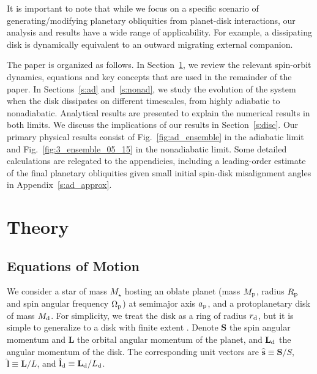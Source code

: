 \documentclass[
        fleqn,
        usenatbib,
    ]{mnras}
\newcommand*{\bm}[1]{\boldsymbol{\mathbf{#1}}}
\newcommand*{\uv}[1]{\hat{\bm{#1}}}
\begin{document}
It is important to note that while we focus on a specific scenario of
generating/modifying planetary obliquities from planet-disk interactions, our
analysis and results have a wide range of applicability. For example, a
dissipating disk is dynamically equivalent to an outward migrating external
companion.

The paper is organized as follows. In Section~\ref{s:eq}, we review the relevant
spin-orbit dynamics, equations and key concepts that are used in the remainder
of the paper. In Sections~\ref{s:ad} and~\ref{s:nonad}, we study the evolution
of the system when the disk dissipates on different timescales, from highly
adiabatic to nonadiabatic. Analytical results are presented to explain the
numerical results in both limits. We discuss the implications of our results in
Section~\ref{s:disc}. Our primary physical results consist of
Fig.~\ref{fig:ad_ensemble} in the adiabatic limit and
Fig.~\ref{fig:3_ensemble_05_15} in the nonadiabatic limit. Some detailed
calculations are relegated to the appendicies, including a leading-order
estimate of the final planetary obliquities given small initial spin-disk
misalignment angles in Appendix~\ref{s:ad_approx}.

\section{Theory}\label{s:eq}

\subsection{Equations of Motion}

We consider a star of mass $M_\star$ hosting an oblate planet (mass $M_{\rm p}$,
radius $R_{\rm p}$ and spin angular frequency $\Omega_{\rm p}$) at semimajor
axis $a_{\rm p}$, and a protoplanetary disk of mass $M_{\rm d}$. For simplicity,
we treat the disk as a ring of radius $r_{\rm d}$, but it is simple to
generalize to a disk with finite extent \citep[see][]{millholland_disk}. Denote
$\bm{S}$ the spin angular momentum and $\bm{L}$ the orbital angular momentum of
the planet, and $\bm{L}_{\rm d}$ the angular momentum of the disk. The
corresponding unit vectors are $\uv{s} \equiv \bm{S} / S$, $\uv{l} \equiv \bm{L}
/ L$, and $\uv{l}_{\rm d} \equiv \bm{L}_{\rm
d} / L_{\rm d}$.
\end{document}
